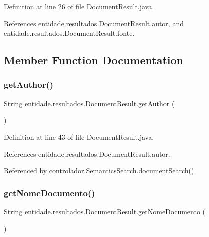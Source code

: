 Definition at line 26 of file Document\+Result.\+java.



References entidade.\+resultados.\+Document\+Result.\+autor, and entidade.\+resultados.\+Document\+Result.\+fonte.



\subsection{Member Function Documentation}
\hypertarget{classentidade_1_1resultados_1_1DocumentResult_a9021856f6324fe1f6c6cdaaec6d00ece}{}\label{classentidade_1_1resultados_1_1DocumentResult_a9021856f6324fe1f6c6cdaaec6d00ece} 
\subsubsection{\texorpdfstring{get\+Author()}{getAuthor()}}
{\footnotesize\ttfamily String entidade.\+resultados.\+Document\+Result.\+get\+Author (\begin{DoxyParamCaption}{ }\end{DoxyParamCaption})}



Definition at line 43 of file Document\+Result.\+java.



References entidade.\+resultados.\+Document\+Result.\+autor.



Referenced by controlador.\+Semantics\+Search.\+document\+Search().

\hypertarget{classentidade_1_1resultados_1_1DocumentResult_aab081f0479196c7d4ecd31780cf3e4a5}{}\label{classentidade_1_1resultados_1_1DocumentResult_aab081f0479196c7d4ecd31780cf3e4a5} 
\subsubsection{\texorpdfstring{get\+Nome\+Documento()}{getNomeDocumento()}}
{\footnotesize\ttfamily String entidade.\+resultados.\+Document\+Result.\+get\+Nome\+Documento (\begin{DoxyParamCaption}{ }\end{DoxyParamCaption})}



